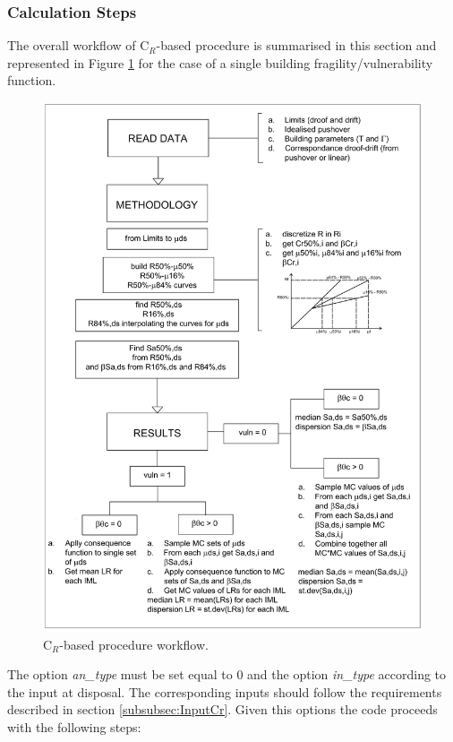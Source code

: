 \subsubsection{Calculation Steps}
The overall workflow of C$_R$-based procedure is summarised in this section and represented in Figure \ref{fig:Cr_workflow} for the case of a single building fragility/vulnerability function. 

\begin{figure}[!htbp]
\centering
\includegraphics[width=15cm]{./figures/Cr-WorkFlow.jpg}
\caption{C$_R$-based procedure workflow.}
\label{fig:Cr_workflow}
\end{figure}

The option \textit{an\_type} must be set equal to 0 and the option \textit{in\_type} according to the input at disposal. The corresponding inputs should follow the requirements described in section \ref{subsubsec:InputCr}. Given this options the code proceeds with the following steps:\\

